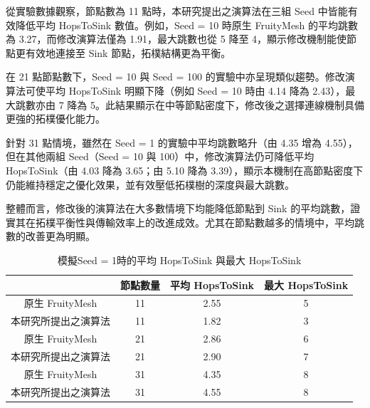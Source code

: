 \begin{ZhChapter}
從實驗數據觀察，節點數為 11 點時，本研究提出之演算法在三組 Seed 中皆能有效降低平均 HopsToSink 數值。例如，Seed = 10 時原生 FruityMesh 的平均跳數為 3.27，而修改演算法僅為 1.91，最大跳數也從 5 降至 4，顯示修改機制能使節點更有效地連接至 Sink 節點，拓樸結構更為平衡。

在 21 點節點數下，Seed = 10 與 Seed = 100 的實驗中亦呈現類似趨勢。修改演算法可使平均 HopsToSink 明顯下降（例如 Seed = 10 時由 4.14 降為 2.43），最大跳數亦由 7 降為 5。此結果顯示在中等節點密度下，修改後之選擇連線機制具備更強的拓樸優化能力。

針對 31 點情境，雖然在 Seed = 1 的實驗中平均跳數略升（由 4.35 增為 4.55），但在其他兩組 Seed（Seed = 10 與 100）中，修改演算法仍可降低平均 HopsToSink（由 4.03 降為 3.65；由 5.10 降為 3.39），顯示本機制在高節點密度下仍能維持穩定之優化效果，並有效壓低拓樸樹的深度與最大跳數。

整體而言，修改後的演算法在大多數情境下均能降低節點到 Sink 的平均跳數，證實其在拓樸平衡性與傳輸效率上的改進成效。尤其在節點數越多的情境中，平均跳數的改善更為明顯。

\begin{table}[H]
    \centering
    \caption{模擬Seed = 1時的平均 HopsToSink 與最大 HopsToSink}
    \label{tab: Seed = 1時的平均 HopsToSink 與最大 HopsToSink}
    \begin{tabular}{|c|c|c|c|}
        \hline
          &節點數量 & 平均 HopsToSink & 最大 HopsToSink \\
        \hline
        原生 FruityMesh & 11 & 2.55 & 5 \\
        \hline
        本研究所提出之演算法 & 11 & 1.82 & 3 \\
        \hline
        原生 FruityMesh & 21 & 2.86 & 6 \\
        \hline
        本研究所提出之演算法 & 21 & 2.90 & 7 \\
        \hline
        原生 FruityMesh & 31 & 4.35 & 8 \\
        \hline
        本研究所提出之演算法 & 31 & 4.55 & 8 \\
        \hline
    \end{tabular}
\end{table}


\end{ZhChapter}
